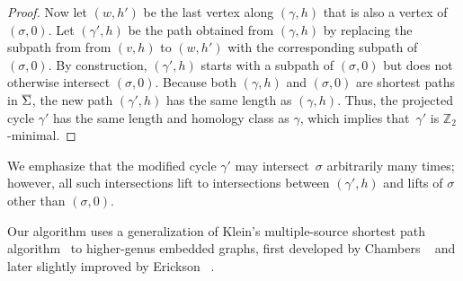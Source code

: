 \documentclass[letterpaper,review]{siamart190516}
\def\Z{\mathbb{Z}}
\def\cycle{\gamma}
\def\Sigmabar{\overline{\smash{\Sigma}\vphantom{t}}}
\begin{document}
{\begin{proof}
Now let $(w,h')$ be the last vertex along $(\cycle,h)$ that is also a vertex of $(\sigma,0)$.  Let $(\cycle', h)$ be the path obtained from $(\cycle, h)$ by replacing the subpath from from $(v,h)$ to $(w,h')$ with the corresponding subpath of $(\sigma,0)$.  By construction, $(\cycle', h)$ starts with a subpath of $(\sigma,0)$ but does not otherwise intersect $(\sigma,0)$.   Because both $(\cycle, h)$ and $(\sigma,0)$ are shortest paths in $\Sigmabar$, the new path $(\cycle', h)$ has the same length as $(\cycle, h)$.  Thus, the projected cycle $\cycle'$ has the same length and homology class as $\cycle$, which implies that~$\cycle'$ is $\Z_2$-minimal.
\end{proof}

We emphasize that the modified cycle $\cycle'$ may intersect~$\sigma$ arbitrarily many times; however, all such intersections lift to intersections between $(\cycle', h)$ and lifts of $\sigma$ other than $(\sigma, 0)$.

Our algorithm uses a generalization of Klein's multiple-source shortest path algorithm~\cite{k-msspp-05} to higher-genus embedded graphs, first developed by Chambers \etal~\cite{cce-msspe-13} and later slightly improved by Erickson \etal~\cite{efl-hmcpf-18}.

}
\end{document}
